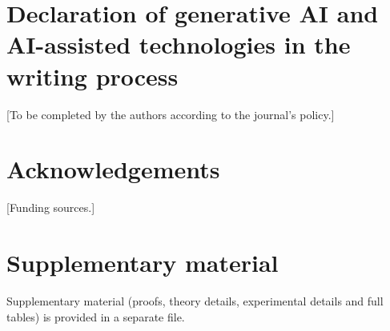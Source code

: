 \documentclass[preprint,12pt,authoryear]{elsarticle}
\begin{document}
\section*{Declaration of generative AI and AI-assisted technologies in the writing process}
[To be completed by the authors according to the journal's policy.]

\section*{Acknowledgements}
[Funding sources.]

\section*{Supplementary material}
Supplementary material (proofs, theory details, experimental details and full tables) is provided in a separate file.



\end{document}
